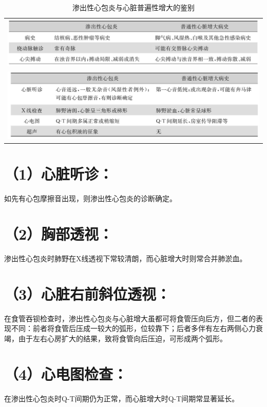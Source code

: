 \begin{longtable}{c}
 \caption{渗出性心包炎与心脏普遍性增大的鉴别}
 \label{tab17-2}
 \endfirsthead
 \caption[]{渗出性心包炎与心脏普遍性增大的鉴别}
 \endhead
 \includegraphics[width=\textwidth,height=\textheight,keepaspectratio]{./images/Image00105.jpg}\\
 \includegraphics[width=\textwidth,height=\textheight,keepaspectratio]{./images/Image00106.jpg}
 \end{longtable}

\section{（1）心脏听诊：}

如先有心包摩擦音出现，则渗出性心包炎的诊断确定。

\section{（2）胸部透视：}

渗出性心包炎时肺野在X线透视下常较清朗，而心脏增大时则常合并肺淤血。

\section{（3）心脏右前斜位透视：}

在食管吞钡检查时，渗出性心包炎与心脏增大虽都可将食管压向后方，但二者的表现不同：前者将食管后压成一较大的弧形，位较靠下；后者多伴有左右两侧心力衰竭，由于左右心房扩大的结果，致将食管向后压迫，可形成两个弧形。

\section{（4）心电图检查：}

在渗出性心包炎时Q-T间期仍为正常，而心脏增大时Q-T间期常显著延长。

